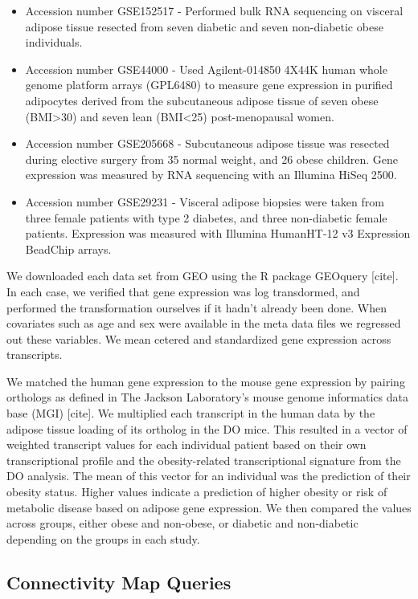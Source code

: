 \documentclass[
]{article}
\begin{document}
\begin{itemize}
\item
  Accession number GSE152517 - Performed bulk RNA sequencing on visceral
  adipose tissue resected from seven diabetic and seven non-diabetic
  obese individuals.
\item
  Accession number GSE44000 - Used Agilent-014850 4X44K human whole
  genome platform arrays (GPL6480) to measure gene expression in
  purified adipocytes derived from the subcutaneous adipose tissue of
  seven obese (BMI\textgreater30) and seven lean (BMI\textless25)
  post-menopausal women.
\item
  Accession number GSE205668 - Subcutaneous adipose tissue was resected
  during elective surgery from 35 normal weight, and 26 obese children.
  Gene expression was measured by RNA sequencing with an Illumina HiSeq
  2500.
\item
  Accession number GSE29231 - Visceral adipose biopsies were taken from
  three female patients with type 2 diabetes, and three non-diabetic
  female patients. Expression was measured with Illumina HumanHT-12 v3
  Expression BeadChip arrays.
\end{itemize}

We downloaded each data set from GEO using the R package GEOquery
{[}cite{]}. In each case, we verified that gene expression was log
transdormed, and performed the transformation ourselves if it hadn't
already been done. When covariates such as age and sex were available in
the meta data files we regressed out these variables. We mean cetered
and standardized gene expression across transcripts.

We matched the human gene expression to the mouse gene expression by
pairing orthologs as defined in The Jackson Laboratory's mouse genome
informatics data base (MGI) {[}cite{]}. We multiplied each transcript in
the human data by the adipose tissue loading of its ortholog in the DO
mice. This resulted in a vector of weighted transcript values for each
individual patient based on their own transcriptional profile and the
obesity-related transcriptional signature from the DO analysis. The mean
of this vector for an individual was the prediction of their obesity
status. Higher values indicate a prediction of higher obesity or risk of
metabolic disease based on adipose gene expression. We then compared the
values across groups, either obese and non-obese, or diabetic and
non-diabetic depending on the groups in each study.

\subsection{Connectivity Map Queries}\label{connectivity-map-queries}
\end{document}
